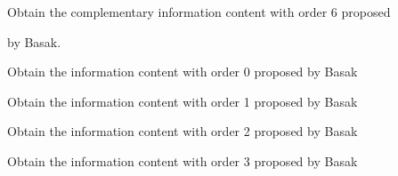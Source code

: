 \documentclass[letterpaper,10pt,english]{sphinxmanual}
\begin{document}

\begin{fulllineitems}
\label{reference/basak:basak.CalculateBasakCIC6}
Obtain the complementary information content with order 6 proposed

by Basak.

\end{fulllineitems}


\begin{fulllineitems}
\label{reference/basak:basak.CalculateBasakIC0}
Obtain the information content with order 0 proposed by Basak

\end{fulllineitems}


\begin{fulllineitems}
\label{reference/basak:basak.CalculateBasakIC1}
Obtain the information content with order 1 proposed by Basak

\end{fulllineitems}


\begin{fulllineitems}
\label{reference/basak:basak.CalculateBasakIC2}
Obtain the information content with order 2 proposed by Basak

\end{fulllineitems}


\begin{fulllineitems}
\label{reference/basak:basak.CalculateBasakIC3}
Obtain the information content with order 3 proposed by Basak

\end{fulllineitems}

\end{document}
